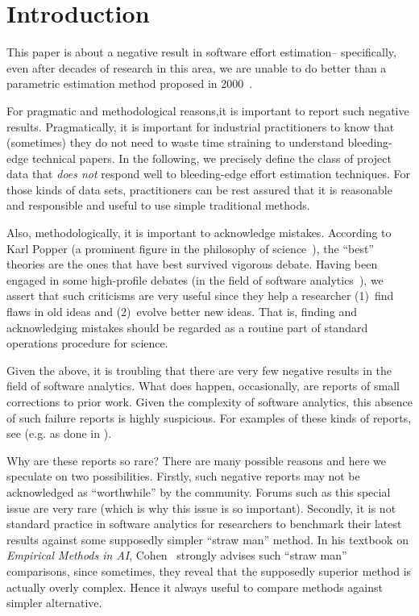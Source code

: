 \documentclass[smallcondesed]{svjour3}
\newenvironment{BLUE}{\color{blue}}{\ignorespacesafterend}
\begin{document}
\newpage
\section{Introduction}
This paper is about a negative result in software effort estimation-- specifically, even after decades
of research in this area,  we are unable to do better than a parametric estimation method proposed in 2000~\cite{boehm00a}.

For pragmatic and methodological reasons,it is important to report such negative results. Pragmatically, it is important
for industrial practitioners to know that (sometimes) they do not need to waste time straining to understand  bleeding-edge technical papers. In the following, we precisely define the class of project data that {\em does not} respond well to  bleeding-edge 
effort estimation techniques.
For those kinds of data sets,   practitioners can be rest assured that it is reasonable and responsible and useful to use simple
traditional methods.

Also, methodologically, it is important to acknowledge mistakes. According to 
 Karl Popper (a prominent figure in the philosophy of science~\cite{popper63}), the ``best'' theories are  the ones that have best survived vigorous debate.  Having been engaged in some
 high-profile debates (in the field
of software analytics~\cite{me07e}), we assert that such criticisms are very  useful
since they help a researcher (1)~find flaws in old ideas and (2)~evolve better
new ideas. That is, finding and acknowledging mistakes should be regarded as a routine part of
standard operations procedure for science. 


 
\begin{BLUE} 
Given the above, it is troubling  that 
there are very few negative results   in the field of software analytics. 
What does happen, occasionally,  are  reports of small
corrections to prior work. Given the complexity of software analytics, this absence of such failure reports is highly suspicious. For examples of these kinds of reports, see (e.g. as done in \cite{menzies13err,Murphy-Hill2012}).
\end{BLUE}

Why are these reports so rare? There are many possible reasons and here we speculate on two possibilities.
Firstly, such negative reports may not be acknowledged as ``worthwhile'' by the community. Forums such
as this special issue are very rare (which is why this issue is so important).
Secondly, it is not standard practice in software analytics for researchers to benchmark their latest
results against some supposedly simpler ``straw man'' method. In his textbook on {\em Empirical Methods in AI}, Cohen~\cite{cohen95} strongly advises such ``straw man'' comparisons, since sometimes, they reveal that the supposedly
superior method is actually overly complex. Hence it
always useful  to compare methods
against simpler alternative. 
\end{document}
